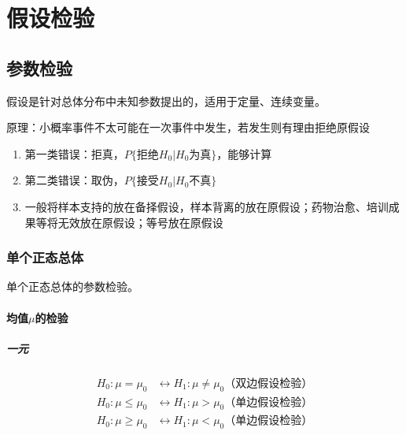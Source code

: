 \documentclass[12pt]{book}
\begin{document}
\chapter{假设检验}





\section{参数检验}



假设是针对总体分布中未知参数提出的，适用于定量、连续变量。

原理：小概率事件不太可能在一次事件中发生，若发生则有理由拒绝原假设
\begin{enumerate}[(1)]
    \item 第一类错误：拒真，$P\{拒绝H_0|H_0为真\}$，能够计算
    \item 第二类错误：取伪，$P\{接受H_0|H_0不真\}$
    \item 一般将样本支持的放在备择假设，样本背离的放在原假设；药物治愈、培训成果等将无效放在原假设；等号放在原假设
\end{enumerate}






\subsection{单个正态总体}





单个正态总体的参数检验。


\subsubsection{均值$\mu$的检验}

\paragraph{一元}

\begin{align*}
    H_0: \mu = \mu_0    & \leftrightarrow  	H_1: \mu \neq  \mu_0 \text{（双边假设检验）} \\
    H_0: \mu \leq \mu_0 & \leftrightarrow  	H_1: \mu > \mu_0 \text{（单边假设检验）}     \\
    H_0: \mu \geq \mu_0 & \leftrightarrow  	H_1: \mu < \mu_0 \text{（单边假设检验）}
\end{align*}
\end{document}
